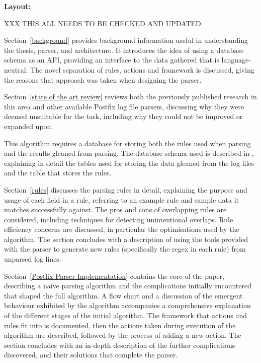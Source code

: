 \vspace{1em}\noindent\textbf{Layout:}

XXX THIS ALL NEEDS TO BE CHECKED AND UPDATED\@.

Section~\ref{background} provides background information useful in
understanding the thesis, parser, and architecture.  It introduces the idea
of using a database schema as an \gls{API}, providing an interface to the
data gathered that is language-neutral.  The novel separation of rules,
actions and framework is discussed, giving the reasons that approach was
taken when designing the parser.

Section~\ref{state of the art review} reviews both the previously published
research in this area and other available Postfix log file parsers,
discussing why they were deemed unsuitable for the task, including why they
could not be improved or expanded upon.

This algorithm requires a database for storing both the rules used when
parsing and the results gleaned from parsing.  The database schema used is
described in , explaining in detail the tables
used for storing the data gleaned from the log files and the table that
stores the rules.

Section~\ref{rules} discusses the parsing rules in detail, explaining the
purpose and usage of each field in a rule, referring to an example rule and
sample data it matches successfully against.  The pros and cons of
overlapping rules are considered, including techniques for detecting
unintentional overlaps.  Rule efficiency concerns are discussed, in
particular the optimisations used by the algorithm.  The section concludes
with a description of using the tools provided with the parser to generate
new rules (specifically the regex in each rule) from unparsed log lines.

Section~\ref{Postfix Parser Implementation} contains the core of the paper,
describing a naive parsing algorithm and the complications initially
encountered that shaped the full algorithm.  A flow chart and a discussion
of the emergent behaviour exhibited by the algorithm accompanies a
comprehensive explanation of the different stages of the initial algorithm.
The framework that actions and rules fit into is documented, then the
actions taken during execution of the algorithm are described, followed by
the process of adding a new action.  The section concludes with an in-depth
description of the further complications discovered, and their solutions
that complete the parser.


